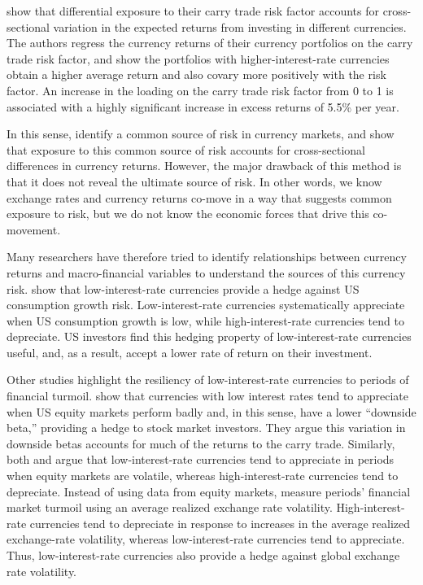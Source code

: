 \documentclass{ar-1col}
\begin{document}
\citet{LustigRoussanovVerdelhan2011} show that differential exposure to their carry trade risk factor accounts for cross-sectional variation in the expected returns from investing in different currencies. The authors regress the currency returns of their currency portfolios on the carry trade risk factor, and show the portfolios with higher-interest-rate currencies obtain a higher average return and also covary more positively with the risk factor. An increase in the loading on the carry trade risk factor from 0 to 1 is associated with a highly significant increase in excess returns of 5.5\% per year.

In this sense, \citet{LustigRoussanovVerdelhan2011} identify a common source of risk in currency markets, and show that exposure to this common source of risk accounts for cross-sectional differences in currency returns. However, the major drawback of this method is that it does not reveal the ultimate source of risk. In other words, we know exchange rates and currency returns co-move in a way that suggests common exposure to risk, but we do not know the economic forces that drive this co-movement.

Many researchers have therefore tried to identify relationships between currency returns and macro-financial variables to understand the sources of this currency risk. \citet{LustigVerdelhan2007} show that low-interest-rate currencies provide a hedge against US consumption growth risk. Low-interest-rate currencies systematically appreciate when US consumption growth is low, while high-interest-rate currencies tend to depreciate. US investors find this hedging property of low-interest-rate currencies useful, and, as a result, accept a lower rate of return on their investment.

Other studies highlight the resiliency of low-interest-rate currencies to periods of financial turmoil. \cite{lettau2014conditional} show that currencies with low interest rates tend to appreciate when US equity markets perform badly and, in this sense, have a lower ``downside beta,'' providing a hedge to stock market investors. They argue this variation in downside betas accounts for much of the returns to the carry trade. Similarly, both \citet{LustigRoussanovVerdelhan2011} and \citet{CampbellMedeirosViceira2010} argue that low-interest-rate currencies tend to appreciate in periods when equity markets are volatile, whereas high-interest-rate currencies tend to depreciate. Instead of using data from equity markets, \citet{Menkhoffetal2012} measure periods' financial market turmoil using an average realized exchange rate volatility. High-interest-rate currencies tend to depreciate in response to increases in the average realized exchange-rate volatility, whereas low-interest-rate currencies tend to appreciate. Thus, low-interest-rate currencies also provide a hedge against global exchange rate volatility. 
\end{document}
